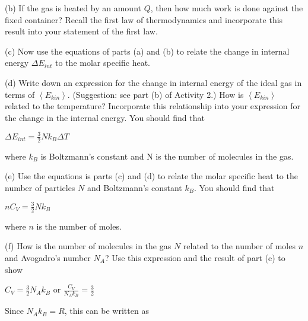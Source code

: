 (b) If the gas is heated by an amount \( Q \), then how much work is done
against the fixed container? Recall the first law of thermodynamics
and incorporate this result into your statement of the first law.
\answerspace{1in}

(c) Now use the equations of parts (a) and (b) to relate the change
in internal energy \( \Delta E_{int} \) to the molar specific heat.
\answerspace{1in}


(d) Write down an expression for  the change in internal
energy of the ideal gas in terms of \( \left\langle E_{kin}\right\rangle  \).
(Suggestion: see part (b) of Activity 2.)
How is \( \left\langle E_{kin}\right\rangle  \) related to the temperature?
Incorporate this relationship into your expression for the change
in the internal energy. You should find that

{\centering \( \Delta E_{int}=\frac{3}{2}Nk_{B}\Delta T \)\par}

where \( k_{B} \) is Boltzmann's constant and N is the number of
molecules in the gas.
\answerspace{1in}

(e) Use the equations is parts (c) and (d) to relate the molar specific
heat to the number of particles \( N \) and Boltzmann's constant \( k_{B} \).
You should find that

{\centering \( nC_{V}=\frac{3}{2}Nk_{B} \)\par}

where \( n \) is the number of moles.
\answerspace{1.5in}

\pagebreak
(f) How is the number of molecules in the gas \( N \) related to the number
of moles \( n \) and Avogadro's number \( N_{A} \)? Use this expression
and the result of part (e) to show \nopagebreak

{\centering \( C_{V}=\frac{3}{2}N_{A}k_{B} \) or \( \frac{C_{V}}{N_{A}k_{B}}=\frac{3}{2} \)\par} 
\answerspace{1.5in}

Since \( N_{A}k_{B}=R \), this can be written as

